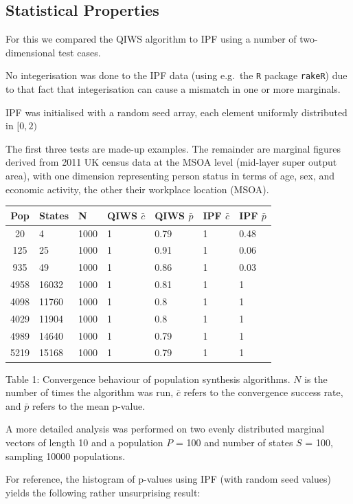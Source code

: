 \documentclass[]{article}
\begin{document}
\subsection{Statistical Properties}\label{statistical-properties}

For this we compared the QIWS algorithm to IPF using a number of
two-dimensional test cases.

No integerisation was done to the IPF data (using e.g.~the \texttt{R}
package \texttt{rakeR}) due to that fact that integerisation can cause a
mismatch in one or more marginals.

IPF was initialised with a random seed array, each element uniformly
distributed in \([0,2)\)

The first three tests are made-up examples. The remainder are marginal
figures derived from 2011 UK census data at the MSOA level (mid-layer
super output area), with one dimension representing person status in
terms of age, sex, and economic activity, the other their workplace
location (MSOA).

\begin{longtable}[]{@{}cllllll@{}}
\toprule
Pop & States & N & QIWS \(\bar{c}\) & QIWS \(\bar{p}\) & IPF \(\bar{c}\)
& IPF \(\bar{p}\)\tabularnewline
\midrule
\endhead
20 & 4 & 1000 & 1 & 0.79 & 1 & 0.48\tabularnewline
125 & 25 & 1000 & 1 & 0.91 & 1 & 0.06\tabularnewline
935 & 49 & 1000 & 1 & 0.86 & 1 & 0.03\tabularnewline
4958 & 16032 & 1000 & 1 & 0.81 & 1 & 1\tabularnewline
4098 & 11760 & 1000 & 1 & 0.8 & 1 & 1\tabularnewline
4029 & 11904 & 1000 & 1 & 0.8 & 1 & 1\tabularnewline
4989 & 14640 & 1000 & 1 & 0.79 & 1 & 1\tabularnewline
5219 & 15168 & 1000 & 1 & 0.79 & 1 & 1\tabularnewline
\bottomrule
\end{longtable}

Table 1: Convergence behaviour of population synthesis algorithms. \(N\)
is the number of times the algorithm was run, \(\bar{c}\) refers to the
convergence success rate, and \(\bar{p}\) refers to the mean p-value.

A more detailed analysis was performed on two evenly distributed
marginal vectors of length 10 and a population \(P\) = 100 and number of
states \(S\) = 100, sampling 10000 populations.

For reference, the histogram of p-values using IPF (with random seed
values) yields the following rather unsurprising result:
\end{document}
